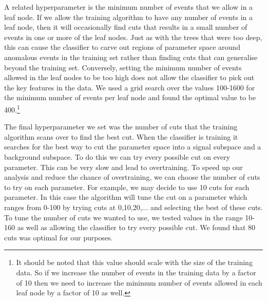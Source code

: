 \documentclass[11pt]{cuthesis}
\begin{document}
A related hyperparameter is the minimum number of events that we allow in a leaf node. If we allow the training algorithm to have any number of events in a leaf node, then it will occasionally find cuts that results in a small number of events in one or more of the leaf nodes. Just as with the trees that were too deep, this can cause the classifier to carve out regions of parameter space around anomalous events in the training set rather than finding cuts that can generalise beyond the training set. Conversely, setting the minimum number of events allowed in the leaf nodes to be too high does not allow the classifier to pick out the key features in the data. We used a grid search over the values 100-1600 for the minimum number of events per leaf node and found the optimal value to be 400.\footnote{It should be noted that this value should scale with the size of the training data. So if we increase the number of events in the training data by a factor of 10 then we need to increase the minimum number of events allowed in each leaf node by a factor of 10 as well.} 

The final hyperparameter we set was the number of cuts that the training algorithm scans over to find the best cut. When the classifier is training it searches for the best way to cut the parameter space into a signal subspace and a background subspace. To do this we can try every possible cut on every parameter. This can be very slow and lead to overtraining. To speed up our analysis and reduce the chance of overtraining, we can choose the number of cuts to try on each parameter. For example, we may decide to use 10 cuts for each parameter. In this case the algorithm will tune the cut on a parameter which ranges from 0-100 by trying cuts at 0,10,20,... and selecting the best of these cuts. To tune the number of cuts we wanted to use, we tested values in the range 10-160 as well as allowing the classifier to try every possible cut. We found that 80 cuts was optimal for our purposes. 
\end{document}
